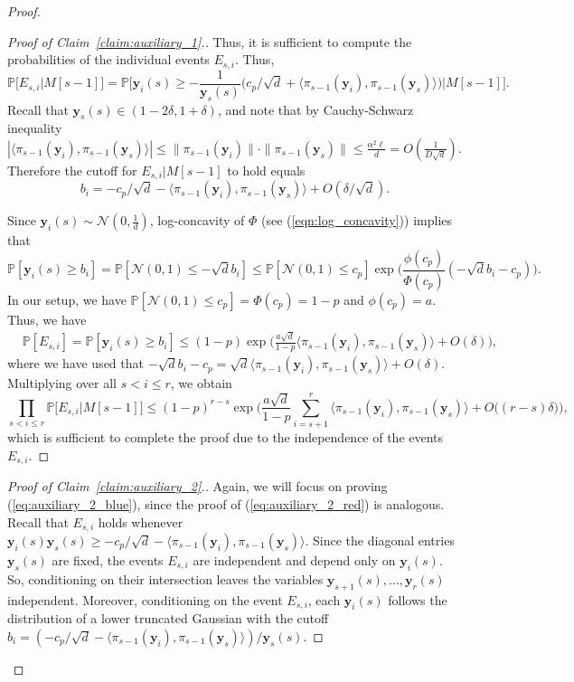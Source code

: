 \documentclass[10pt,a4paper]{amsart}
\def\Pb{\mathbb{P}}
\def\by{\boldsymbol{y}}
\def\cN{\mathcal{N}}
\begin{document}
\begin{proof}
\begin{proof}[Proof of Claim~\ref{claim:auxiliary_1}.]
Thus, it is sufficient to compute the probabilities of the individual events $E_{s, i}$. Thus,
{\smaller[0.3]
\[\Pb\big[E_{s, i}|M[s\!-\!1]\big]=\Pb\bigg[\by_i(s)\geq -\frac{1}{\by_s(s)}\Big(c_p/\sqrt{d}\!+\!\langle \pi_{s-\!1}(\by_i), \pi_{s-\!1}(\by_s)\rangle\Big)\bigg| M[s\!-\!1]\bigg].\]
}
Recall that $\by_s(s)\in (1-2\delta, 1+\delta)$, and note that by Cauchy-Schwarz inequality
$|\langle \pi_{s-1}(\by_i), \pi_{s-1}(\by_s)\rangle|\leq \|\pi_{s-1}(\by_i)\|\cdot \|\pi_{s-1}(\by_s)\|\leq \frac{\alpha^2 \ell}{d}=O(\frac{1}{D\sqrt{d}})$. Therefore the cutoff for $E_{s, i}| M[s\!-\!1]$ to hold equals 
$$b_i=-c_p/\sqrt{d}-\langle \pi_{s-1}(\by_i), \pi_{s-1}(\by_s)\rangle+O(\delta/{\sqrt{d}}).$$ 

Since $\by_i(s)\sim \cN(0, \frac{1}{d})$, log-concavity of $\Phi$ (see (\ref{eqn:log_concavity})) implies that
{\smaller[0.3]
\[\Pb[\by_i(s)\geq b_i]=\Pb[\cN(0, 1)\leq -\sqrt{d}b_i]\leq \Pb[\cN(0, 1)\leq c_p]\exp\Big(\frac{\phi(c_p)}{\Phi(c_p)}(-\sqrt{d}b_i\!-\!c_p)\Big).\]
}
In our setup, we have $\Pb[\cN(0, 1)\leq c_p]=\Phi(c_p)=1-p$ and $\phi(c_p)=a$. Thus, we have
{\smaller[0.3]
\begin{align*}
&\Pb[E_{s, i}]=\Pb[\by_i(s)\geq b_i]\leq (1\!-\!p)\exp\Big(\frac{a\sqrt{d}}{1\!-\!p}\langle \pi_{s-1}(\by_i), \pi_{s-1}(\by_s)\rangle\!+\!O(\delta)\Big),
\end{align*}
}
where we have used that $-\sqrt{d}b_i-c_p=\sqrt{d}\langle \pi_{s-1}(\by_i), \pi_{s-1}(\by_s)\rangle+O(\delta)$. Multiplying over all $s< i\leq r$, we obtain
{\smaller[0.3]
\[\prod_{s<i\leq r}\Pb\Big[E_{s, i}\Big|M[s\!-\!1]\Big]\leq (1\!-\!p)^{r-s}\exp\bigg(\frac{a\sqrt{d}}{1\!-\!p}\sum_{i=s+1}^r \langle \pi_{s-1}(\by_i), \pi_{s-1}(\by_s)\rangle\!+\!O\big((r\!-\!s)\delta\big)\bigg),\]
}
which is sufficient to complete the proof due to the independence of the events $E_{s, i}$.
\end{proof}

\begin{proof}[Proof of Claim~\ref{claim:auxiliary_2}.]
Again, we will focus on proving (\ref{eq:auxiliary_2_blue}), since the proof of (\ref{eq:auxiliary_2_red}) is analogous. Recall that $E_{s, i}$ holds whenever $\by_i(s)\by_s(s)\geq -c_p/\sqrt{d}-\langle \pi_{s-1}(\by_i), \pi_{s-1}(\by_s)\rangle$. Since the diagonal entries $\by_s(s)$ are fixed, the events $E_{s, i}$ are independent and depend only on $\by_i(s)$. So, conditioning on their intersection leaves the variables $\by_{s+1}(s), \dots, \by_{r}(s)$ independent. Moreover, conditioning on the event $E_{s, i}$, each $\by_i(s)$ follows the distribution of a lower truncated Gaussian with the cutoff $b_i=(-c_p/\sqrt{d}-\langle \pi_{s-1}(\by_i), \pi_{s-1}(\by_s)\rangle)/\by_s(s)$.


\end{proof}
\end{proof}
\end{document}
